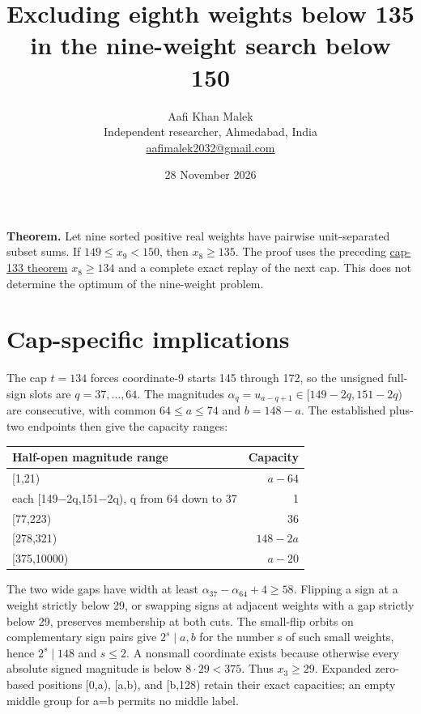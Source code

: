 \documentclass[11pt,letterpaper]{article}
\title{Excluding eighth weights below 135 in the nine-weight search below 150}
\author{Aafi Khan Malek\\ \small Independent researcher, Ahmedabad, India\\
\small\href{mailto:aafimalek2032@gmail.com}{aafimalek2032@gmail.com}}
\date{28 November 2026}
\begin{document}
\maketitle
\textbf{Theorem.} Let nine sorted positive real weights have pairwise
unit-separated subset sums. If \(149\le x_9<150\), then \(x_8\ge135\).
The proof uses the preceding
\href{https://github.com/Aafimalek/novel-discoveries/tree/32b96614f57a26cbf30acb17235ad4baf40ff92a/nine-separated-subset-sums/verification/rank-cuts-below-150/penultimate-cap-133}{cap-133 theorem}
\(x_8\ge134\) and a complete exact replay of the next cap.
This does not determine the optimum of the nine-weight problem.

\section{Cap-specific implications}\label{cap-specific-implications}

The cap \(t=134\) forces coordinate-9 starts 145 through 172, so the
unsigned full-sign slots are \(q=37,\dots,64\). The magnitudes
\(\alpha_q=u_{a-q+1}\in[149-2q,151-2q)\) are consecutive, with common
\(64\le a\le74\) and \(b=148-a\). The established plus-two endpoints
then give the capacity ranges:

\begin{longtable}[]{@{}lr@{}}
\toprule\noalign{}
Half-open magnitude range & Capacity \\
\midrule\noalign{}
\endhead
\bottomrule\noalign{}
\endlastfoot
{[}1,21) & \(a-64\) \\
each {[}149−2q,151−2q), q from 64 down to 37 & 1 \\
{[}77,223) & 36 \\
{[}278,321) & \(148-2a\) \\
{[}375,10000) & \(a-20\) \\
\end{longtable}

The two wide gaps have width at least
\(\alpha_{37}-\alpha_{64}+4\ge58\). Flipping a sign at a weight strictly
below 29, or swapping signs at adjacent weights with a gap strictly
below 29, preserves membership at both cuts. The small-flip orbits on
complementary sign pairs give \(2^s\mid a,b\) for the number s of such
small weights, hence \(2^s\mid148\) and \(s\le2\). A nonsmall coordinate
exists because otherwise every absolute signed magnitude is below
\(8\cdot29<375\). Thus \(x_3\ge29\). Expanded zero-based positions
{[}0,a), {[}a,b), and {[}b,128) retain their exact capacities; an empty
middle group for a=b permits no middle label.
\end{document}
